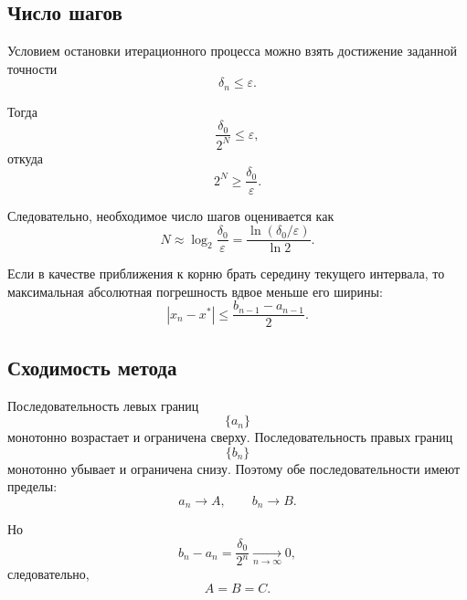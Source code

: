 \documentclass[../final.tex]{subfiles}
\begin{document}
\subsection{Число шагов}

Условием остановки итерационного процесса можно взять достижение
заданной точности
%
\begin{equation*}
    \delta_n\leq\varepsilon.
\end{equation*}

Тогда
%
\begin{equation*}
    \frac{\delta_0}{2^N}\leq\varepsilon,
\end{equation*}
%
откуда
%
\begin{equation*}
    2^N\geq\frac{\delta_0}{\varepsilon}.
\end{equation*}

Следовательно, необходимое число шагов оценивается как
%
\begin{equation*}
    N
    \approx
    \log_2\frac{\delta_0}{\varepsilon}
    =
    \frac{\ln(\delta_0/\varepsilon)}{\ln2}.
\end{equation*}

Если в качестве приближения к корню брать середину текущего
интервала, то максимальная абсолютная погрешность вдвое меньше его
ширины:
%
\begin{equation*}
    \left|x_n-x^*\right|
    \leq
    \frac{b_{n-1}-a_{n-1}}{2}.
\end{equation*}


\subsection{Сходимость метода}

Последовательность левых границ
%
\begin{equation*}
    \{a_n\}
\end{equation*}
%
монотонно возрастает и ограничена сверху. Последовательность правых
границ
%
\begin{equation*}
    \{b_n\}
\end{equation*}
%
монотонно убывает и ограничена снизу. Поэтому обе
последовательности имеют пределы:
%
\begin{equation*}
    a_n\to A,
    \qquad
    b_n\to B.
\end{equation*}

Но
%
\begin{equation*}
    b_n-a_n
    =
    \frac{\delta_0}{2^n}
    \underset{n\to\infty}{\longrightarrow}
    0,
\end{equation*}
%
следовательно,
%
\begin{equation*}
    A=B=C.
\end{equation*}
\end{document}
